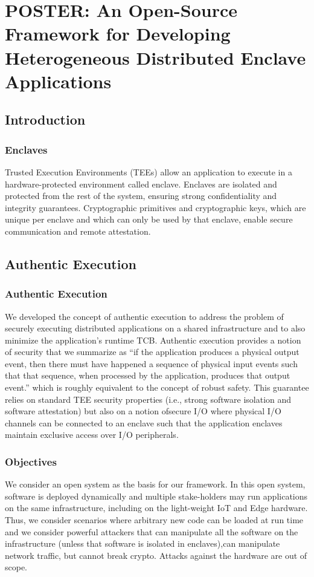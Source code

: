 \documentclass{article}
\begin{document}
\section{POSTER: An Open-Source Framework for Developing Heterogeneous Distributed Enclave Applications}

\subsection{Introduction}

\subsubsection{Enclaves}

Trusted Execution Environments (TEEs) allow an application to execute in a hardware-protected environment called enclave. Enclaves are isolated and protected from the rest of the system, ensuring strong confidentiality and integrity guarantees. Cryptographic primitives and cryptographic keys, which are unique per enclave and which can only be used by that enclave, enable secure communication and remote attestation.

\subsection{Authentic Execution}

\subsubsection{Authentic Execution}

We developed the concept of authentic execution to address the problem of securely executing distributed applications on a shared infrastructure and to also minimize the application’s runtime TCB. Authentic execution provides a notion of security that we summarize as “if the application produces a physical output event, then there must have happened a sequence of physical input events such that that sequence, when processed by the application, produces that output event.” which is roughly equivalent to the concept of robust safety. This guarantee relies on standard TEE security properties (i.e., strong software isolation and software attestation) but also on a notion ofsecure I/O where physical I/O channels can be connected to an enclave such that the application enclaves maintain exclusive access over I/O peripherals.

\subsubsection{Objectives}

We consider an open system as the basis for our framework. In this open system, software is deployed dynamically and multiple stake-holders may run applications on the same infrastructure, including on the light-weight IoT and Edge hardware. Thus, we consider scenarios where arbitrary new code can be loaded at run time and we consider powerful attackers that can manipulate all the software on the infrastructure (unless that software is isolated in enclaves),can manipulate network traffic, but cannot break crypto. Attacks against the hardware are out of scope.
\end{document}
